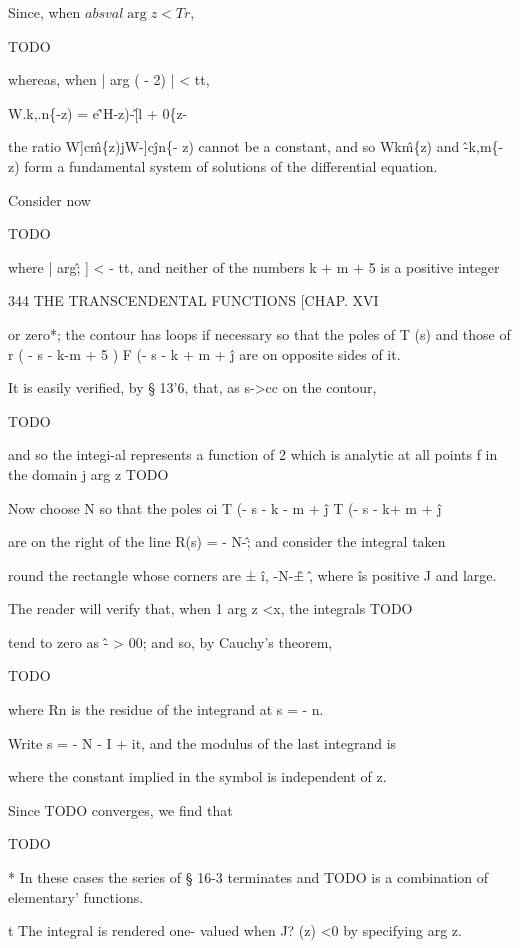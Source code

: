 Since, when $absval{\arg z} < Tr$,

TODO

whereas, when | arg ( - 2) | < tt,

W.k,.n\{-z) = e\^'H-z)-\^[l + 0\{z-%

the ratio W]c\^m\{z)jW-]c\^jn\{- z) cannot be a constant, and so
Wk\^m\{z) and \^-k,m\{- z) form a fundamental system of solutions of
the differential equation.


Consider now

TODO

where | arg\^; ] < - tt, and neither of the numbers k + m + 5 is a
positive integer

344 THE TRANSCENDENTAL FUNCTIONS [CHAP. XVI

or zero*; the contour has loops if necessary so that the poles of T
(s) and those of r ( - s - k-m + 5 ) F (- s - k + m + \^j are on
opposite sides of it.

It is easily verified, by § 13'6, that, as s->cc on the contour,

TODO

and so the integi-al represents a function of 2 which is analytic at
all points f in the domain j arg z TODO

Now choose N so that the poles oi T (- s - k - m + \^j T (- s - k+ m +
\^j

are on the right of the line R(s) = - N-\^; and consider the integral
taken

round the rectangle whose corners are ± \^i, -N-\^± \^, where \^ is
positive J and large.

The reader will verify that, when 1 arg z <x, the integrals TODO

tend to zero as \^- > 00; and so, by Cauchy's theorem,

TODO

where Rn is the residue of the integrand at s = - n.

Write s = - N - I + it, and the modulus of the last integrand is

where the constant implied in the symbol is independent of z.

Since TODO converges, we find that

TODO

* In these cases the series of § 16-3 terminates and TODO is a
combination of elementary' functions.

t The integral is rendered one- valued when J? (z) <0 by specifying
arg z.

